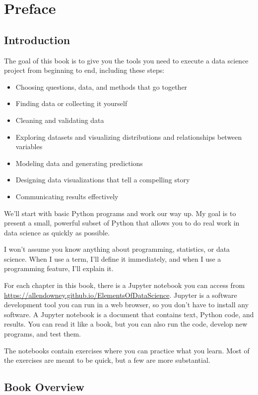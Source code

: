\chapter*{Preface}

\section*{Introduction}

The goal of this book is to give you the tools you need to execute a data science project from beginning to end, including these steps:

\begin{itemize}
\item
  Choosing questions, data, and methods that go together
\item
  Finding data or collecting it yourself
\item
  Cleaning and validating data
\item
  Exploring datasets and visualizing distributions and relationships between variables
\item
  Modeling data and generating predictions
\item
  Designing data visualizations that tell a compelling story
\item
  Communicating results effectively
\end{itemize}

We'll start with basic Python programs and work our way up.
My goal is to present a small, powerful subset of Python that allows you to do real work in data science as quickly as possible.

I won't assume you know anything about programming, statistics, or data science. When I use a term, I'll define it immediately, and when I use a programming feature, I'll explain it.

For each chapter in this book, there is a Jupyter notebook you can access from \url{https://allendowney.github.io/ElementsOfDataScience}.
Jupyter is a software development tool you can run in a web browser, so you don't have to install any software. A Jupyter notebook is a document that contains text, Python code, and results.
You can read it like a book, but you can also run the code, develop new programs, and test them.

The notebooks contain exercises where you can practice what you learn.
Most of the exercises are meant to be quick, but a few are more substantial.

\section*{Book Overview}

